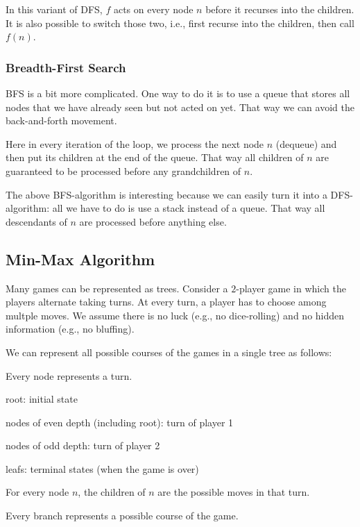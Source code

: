 In this variant of DFS, $f$ acts on every node $n$ before it recurses into the children.
It is also possible to switch those two, i.e., first recurse into the children, then call $f(n)$.

\subsubsection{Breadth-First Search}

BFS is a bit more complicated.
One way to do it is to use a queue that stores all nodes that we have already seen but not acted on yet.
That way we can avoid the back-and-forth movement.

\begin{acode}
\end{acode}

Here in every iteration of the loop, we process the next node $n$ (dequeue) and then put its children at the end of the queue.
That way all children of $n$ are guaranteed to be processed before any grandchildren of $n$.
\medskip

The above BFS-algorithm is interesting because we can easily turn it into a DFS-algorithm: all we have to do is use a stack instead of a queue.
That way all descendants of $n$ are processed before anything else.

\subsection{Min-Max Algorithm}

Many games can be represented as trees.
Consider a $2$-player game in which the players alternate taking turns.
At every turn, a player has to choose among multple moves.
We assume there is no luck (e.g., no dice-rolling) and no hidden information (e.g., no bluffing).

We can represent all possible courses of the games in a single tree as follows:
\begin{compactitem}
 \item Every node represents a turn.
  \begin{compactitem}
    \item root: initial state
    \item nodes of even depth (including root): turn of player 1
    \item nodes of odd depth: turn of player 2
    \item leafs: terminal states (when the game is over)
  \end{compactitem}
 \item For every node $n$, the children of $n$ are the possible moves in that turn.
 \item Every branch represents a possible course of the game.
\end{compactitem}

